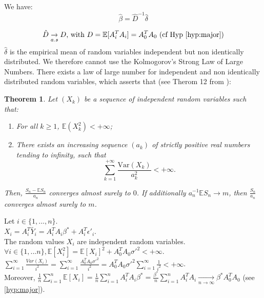 We have:
\[
\hat{\beta} = \hat{D} ^{-1} \hat{\delta}
\]

\[
\hat{D}  \underset{a.s}{\rightarrow} D \text{,  with } D = \mathbb{E}[A_i^T A_i ] = A_0^T A_0 \text{ (cf Hyp \ref{hyp:major})}
\]
$\hat{\delta}$ is the empirical mean of random variables independent but non identically distributed. 
We therefore cannot use the Kolmogorov's Strong Law of Large Numbers. 
There exists a law of large number for independent and non identically distributed random variables, which asserts that (see Therom 12 from \cite{suquet2004lois}):




\theoremstyle{plain}
\newtheorem{theorem}{Theorem}

\begin{theorem}
    \label{thm:1}
    Let $(X_k)$ be a sequence of independent random variables such that:
    \begin{enumerate}
        \item For all $k \geq 1$, $\mathbb{E}(X_k^2) < +\infty$;
        \item There exists an increasing sequence $(a_k)$ of strictly positive real numbers tending to infinity, such that
        \[
        \sum_{k=1}^{+\infty} \frac{\mathrm{Var}(X_k)}{a_k^2} < +\infty.
        \]
    \end{enumerate}
    Then, $\frac{S_n - \mathbb{E}S_n}{a_n}$ converges almost surely to $0$. If additionally $a_n^{-1} \mathbb{E}S_n \to m$, then $\frac{S_n}{a_n}$ converges almost surely to $m$.\\[2cm]
\end{theorem}

Let $ i \in \{1, ..., n\}$.\\[0.2cm]
$X_i = A_i ^T \tilde{Y_i} = A_i^T A_i \beta^* + A_i ^T \epsilon'_i$. \\
The random values $X_i$ are independent random variables.\\
$\forall i \in \{ 1, ...  n \}, \mathbb{E}[X_i^2] = \mathbb{E}[X_i] ^2 + A_0 ^T A_0 \sigma'^2 < + \infty $.\\

$\sum_{i=1}^{\infty } \frac{Var(X_i)}{i^2} = \sum_{i=1}^{\infty } \frac{A_0^T A_0 \sigma'^2}{i^2} =  A_0^T A_0 \sigma'^2 \sum_{i=1}^{\infty } \frac{1}{i^2} < + \infty$.\\

Moreover,  $\frac{1}{n} \sum_{i=1}^{n} \mathbb{E}[X_i] =\frac{1}{n} \sum_{i=1}^{n} A_i^T A_i \beta^* = \frac{\beta^*}{n} \sum_{i=1}^{n} A_i^T A_i \underset{n\rightarrow \infty}{\rightarrow} \beta ^*  A_0 ^T A_0 $ (see \ref{hyp:major}).\\


